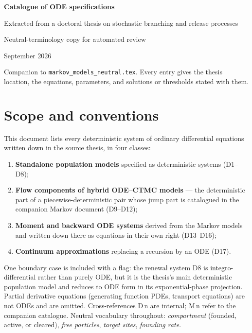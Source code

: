 \documentclass[11pt,a4paper]{report}
\begin{document}
\begin{titlepage}
\centering
\vspace*{4.2cm}
{\LARGE\bfseries Catalogue of ODE specifications\par}
\vspace{10pt}
{\large Extracted from a doctoral thesis on stochastic branching and release
processes\par}
\vspace{1.6cm}
{\large Neutral-terminology copy for automated review\par}
\vspace{6pt}
{September 2026\par}
\vfill
{\small Companion to \texttt{markov\_models\_neutral.tex}. Every entry gives
the thesis location, the equations, parameters, and solutions or thresholds
stated with them.\par}
\vspace*{1.2cm}
\end{titlepage}

\tableofcontents
\clearpage

\chapter*{Scope and conventions}

This document lists every deterministic system of ordinary differential
equations written down in the source thesis, in four classes:

\begin{enumerate}[leftmargin=1.9em,itemsep=0.2em]
\item \textbf{Standalone population models} specified as deterministic
systems (D1--D8);
\item \textbf{Flow components of hybrid ODE--CTMC models} --- the
deterministic part of a piecewise-deterministic pair whose jump part is
catalogued in the companion Markov document (D9--D12);
\item \textbf{Moment and backward ODE systems} derived from the Markov
models and written down there as equations in their own right (D13--D16);
\item \textbf{Continuum approximations} replacing a recursion by an ODE
(D17).
\end{enumerate}

One boundary case is included with a flag: the renewal system D8 is
integro-differential rather than purely ODE, but it is the thesis's main
deterministic population model and reduces to ODE form in its
exponential-phase projection. Partial derivative equations (generating
function PDEs, transport equations) are not ODEs and are omitted. Cross-references
D\,n are internal; M\,n refer to the companion catalogue. Neutral vocabulary
throughout: \emph{compartment} (founded, active, or cleared), \emph{free
particles}, \emph{target sites}, \emph{founding rate}.
\end{document}
